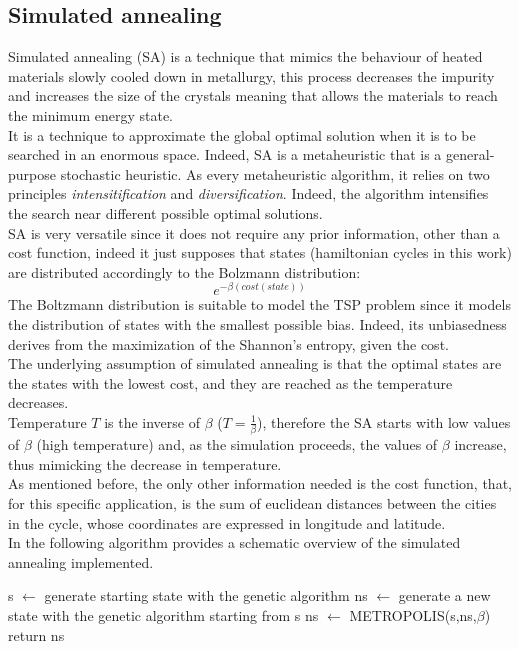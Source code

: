 \documentclass{article}
\begin{document}
\subsection{Simulated annealing}
Simulated annealing (SA) is a technique that mimics the behaviour of heated materials slowly cooled down in metallurgy, this process decreases the impurity and increases the size of the crystals meaning that allows the materials to reach the minimum energy state. \\
It is a technique to approximate the global optimal solution when it is to be searched in an enormous space. Indeed, SA is a metaheuristic that is a general-purpose stochastic heuristic. As every metaheuristic algorithm, it relies on two principles \textit{intensitification} and \textit{diversification}. Indeed, the algorithm intensifies the search near different possible optimal solutions.\\
SA is very versatile since it does not require any prior information, other than a cost function, indeed it just supposes that states (hamiltonian cycles in this work) are distributed accordingly to the Bolzmann distribution:
\begin{equation}
e^{- \beta (cost(state))}
\end{equation}
The Boltzmann distribution is suitable to model the TSP problem since it models the distribution of states with the smallest possible bias. Indeed, its unbiasedness derives from the maximization of the Shannon's entropy, given the cost.\\
The underlying assumption of simulated annealing is that the optimal states are the states with the lowest cost, and they are reached as the temperature decreases.\\
Temperature $T$ is the inverse of $\beta$ ($T = \frac{1}{\beta}$), therefore the SA starts with low values of $\beta$ (high temperature) and, as the simulation proceeds, the values of $\beta$  increase, thus mimicking the decrease in temperature. \\
As mentioned before, the only other information needed is the cost function, that, for this specific application, is the sum of euclidean distances between the cities in the cycle, whose coordinates are expressed in longitude and latitude.\\
In the following algorithm provides a schematic overview of the simulated annealing implemented.

\begin{algorithm}[H]
    \begin{algorithmic}[1]
        \State s $\leftarrow$ generate starting state with the genetic algorithm
         	 \State ns $\leftarrow$ generate a new state with the genetic algorithm starting from s
         	\State ns $\leftarrow$ METROPOLIS(s,ns,$\beta$)
         	\EndFor
        \EndFor
        \State return ns
       \EndFunction
\end{algorithmic}
\end{algorithm}
\end{document}
